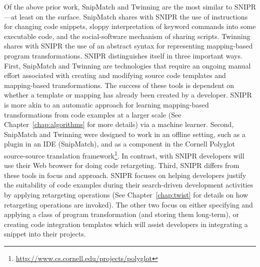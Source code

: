 Of the above prior work, SnipMatch and Twinning are the most similar to \uppercase{SnipR}---at least on the surface. SnipMatch shares with \uppercase{SnipR} the use of instructions for changing code snippets, sloppy interpretation of keyword commands into some executable code, and the social-software mechanism of sharing scripts. Twinning shares with \uppercase{SnipR} the use of an abstract syntax for representing mapping-based program transformations. \uppercase{SnipR} distinguishes itself in three important ways. First, SnipMatch and Twinning are technologies that require an ongoing manual effort associated with creating and modifying source code templates and mapping-based transformations. The success of these tools is dependent on whether a template or mapping has already been created by a developer. \uppercase{SnipR} is more akin to an automatic approach for learning mapping-based transformations from code examples at a larger scale (See Chapter~\ref{chap:algorithms} for more details) via a machine learner. Second, SnipMatch and Twinning were designed to work in an offline setting, such as a plugin in an IDE (SnipMatch), and as a component in the Cornell Polyglot source-source translation framework\footnote{\url{http://www.cs.cornell.edu/projects/polyglot}}. In contrast, with \uppercase{SnipR} developers will use their Web browser for doing code retargeting. Third, \uppercase{SnipR} differs from these tools in focus and approach. \uppercase{SnipR} focuses on helping developers justify the suitability of code examples during their search-driven development activities by applying retargeting operations (See Chapter~\ref{chap:twist} for details on how retargeting operations are invoked). The other two focus on either specifying and applying a class of program transformation (and storing them long-term), or creating code integration templates which will assist developers in integrating a snippet into their projects.  
